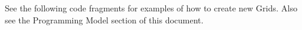  
\parskip        0pt
\parindent      0pt
\baselineskip  11pt
 
\def\bv{\begin{verbatim}}
\def\ev{\end{verbatim}}
\def\be{\begin{equation}}
\def\ee{\end{equation}}
\def\bea{\begin{eqnarray}}
\def\eea{\end{eqnarray}}
\def\bi{\begin{itemize}}
\def\ei{\end{itemize}}
\def\bn{\begin{enumerate}}
\def\en{\end{enumerate}}
\def\bd{\begin{description}}
\def\ed{\end{description}}
\def\({\left (}
\def\){\right )}
\def\[{\left [}
\def\]{\right ]}
\def\<{\left  \langle}
\def\>{\right \rangle}
\def\cI{{\cal I}}
\def\diag{\mathop{\rm diag}}
\def\tr{\mathop{\rm tr}}


 

  
   See the following code fragments for examples of how to create new Grids.  
   Also see the Programming Model section of this document.
  
